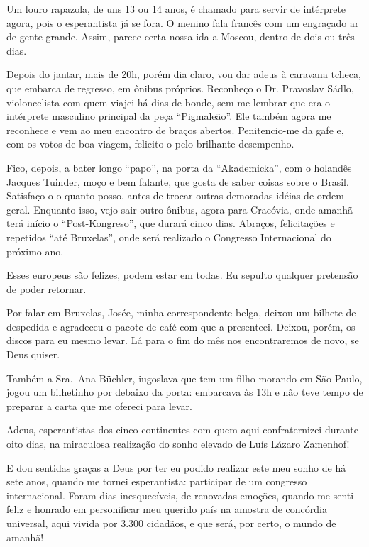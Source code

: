 Um louro rapazola, de uns 13 ou 14 anos, é chamado para servir de intérprete agora, pois o esperantista já se fora. O menino fala francês com um engraçado ar de gente grande. Assim, parece certa nossa ida a Moscou, dentro de dois ou três dias.

Depois do jantar, mais de 20h, porém dia claro, vou dar adeus à caravana tcheca, que embarca de regresso, em ônibus próprios. Reconheço o Dr. Pravoslav Sádlo, violoncelista com quem viajei há dias de bonde, sem me lembrar que era o intérprete masculino principal da peça ``Pigmaleão''. Ele também agora me reconhece e vem ao meu encontro de braços abertos. Penitencio-me da gafe e, com os votos de boa viagem, felicito-o pelo brilhante desempenho.

Fico, depois, a bater longo ``papo'', na porta da ``Akademicka'', com o holandês Jacques Tuinder, moço e bem falante, que gosta de saber coisas sobre o Brasil. Satisfaço-o o quanto posso, antes de trocar outras demoradas idéias de ordem geral. Enquanto isso, vejo sair outro ônibus, agora para Cracóvia, onde amanhã terá início o ``Post-Kongreso'', que durará cinco dias. Abraços, felicitações e repetidos ``até Bruxelas'', onde será realizado o Congresso Internacional do próximo ano.

Esses europeus são felizes, podem estar em todas. Eu sepulto qualquer pretensão de poder retornar.

Por falar em Bruxelas, Josée, minha correspondente belga, deixou um bilhete de despedida e agradeceu o pacote de café com que a presenteei. Deixou, porém, os discos para eu mesmo levar. Lá para o fim do mês nos encontraremos de novo, se Deus quiser.

Também a Sra.~Ana Büchler, iugoslava que tem um filho morando em São Paulo, jogou um bilhetinho por debaixo da porta: embarcava às 13h e não teve tempo de preparar a carta que me ofereci para levar.

Adeus, esperantistas dos cinco continentes com quem aqui confraternizei durante oito dias, na miraculosa realização do sonho elevado de Luís Lázaro Zamenhof!

E dou sentidas graças a Deus por ter eu podido realizar este meu sonho de há sete anos, quando me tornei esperantista: participar de um congresso internacional. Foram dias inesquecíveis, de renovadas emoções, quando me senti feliz e honrado em personificar meu querido país na amostra de concórdia universal, aqui vivida por 3.300 cidadãos, e que será, por certo, o mundo de amanhã!

